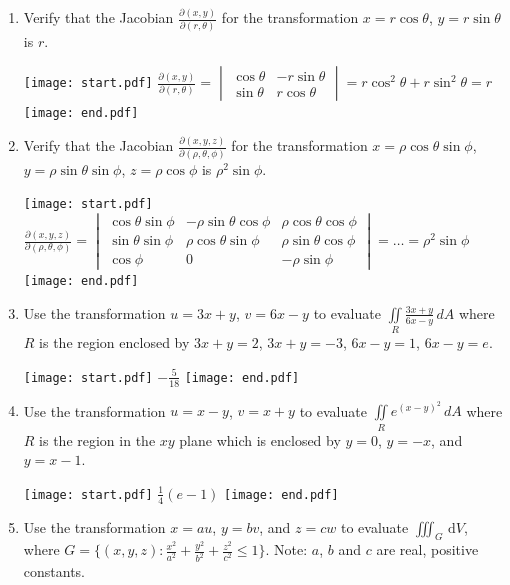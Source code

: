 \documentclass[12pt]{article}
\begin{document}
\begin{enumerate}
\begin{enumerate}
\end{enumerate}

\item Verify that the Jacobian $\frac{\partial(x,y)}{\partial(r,\theta)}$ for the transformation $x=r\cos{\theta}$, $y=r\sin{\theta}$ is $r$.

\texttt{[image: start.pdf]}
{{$\frac{\partial(x,y)}{\partial(r,\theta)}=\begin{vmatrix}\cos{\theta} & -r\sin{\theta}\\ \sin{\theta} & r\cos{\theta}\end{vmatrix}=r\cos^2{\theta}+r\sin^2{\theta}=r$}}
\texttt{[image: end.pdf]}


\item Verify that the Jacobian $\frac{\partial(x,y,z)}{\partial(\rho,\theta,\phi)}$ for the transformation $x=\rho\cos{\theta}\sin{\phi}$, $y=\rho\sin{\theta}\sin{\phi}$, $z=\rho\cos{\phi}$ is $\rho^2\sin{\phi}$.

\texttt{[image: start.pdf]}
{{$\frac{\partial(x,y,z)}{\partial(\rho,\theta,\phi)}=\begin{vmatrix} \cos{\theta}\sin{\phi} & -\rho\sin{\theta}\cos{\phi} & \rho\cos{\theta}\cos{\phi}\\ \sin{\theta}\sin{\phi} & \rho\cos{\theta}\sin{\phi} & \rho\sin{\theta}\cos{\phi}\\ \cos{\phi} & 0 & -\rho\sin{\phi} \end{vmatrix}=\dots = \rho^2\sin{\phi}$}}
\texttt{[image: end.pdf]}


\item Use the transformation $u=3x+y$, $v=6x-y$ to evaluate $\iint \limits_{R} \frac{3x+y}{6x-y} \,dA$ where $R$ is the region enclosed by $3x+y=2$, $3x+y=-3$, $6x-y=1$, $6x-y=e$.

\texttt{[image: start.pdf]}
{{$-\frac{5}{18}$}}
\texttt{[image: end.pdf]}


\item Use the transformation $u=x-y$, $v=x+y$ to evaluate $\iint \limits_{R} e^{(x-y)^2} \,dA$ where $R$ is the region in the $xy$ plane which is enclosed by $y=0$, $y=-x$, and $y=x-1$.

\texttt{[image: start.pdf]}
{{$\frac{1}{4}(e-1)$}}
\texttt{[image: end.pdf]}


\item Use the transformation $x=au$, $y=bv$, and $z=cw$ to evaluate $\displaystyle \iiint_{G}  \,\mathrm{d}V$, where $G = \displaystyle \big\{ (x,y,z) : \frac{x^2}{a^2}+\frac{y^2}{b^2}+\frac{z^2}{c^2}\leq 1 \big\}$.  Note: $a$, $b$ and $c$ are real, positive constants.


\end{enumerate}
\end{document}
